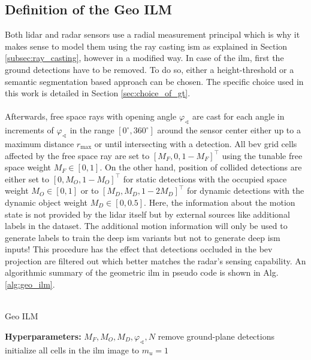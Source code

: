 \subsection{Definition of the Geo ILM}
\label{subsec:method_geo_ilm}
Both lidar and radar sensors use a radial measurement principal which is why it makes sense to model them using the ray casting \gls{ism} as explained in Section \ref{subsec:ray_casting}, however in a modified way. In case of the \gls{ilm}, first the ground detections have to be removed. To do so, either a height-threshold or a semantic segmentation based approach can be chosen. The specific choice used in this work is detailed in Section \ref{sec:choice_of_gt}.
\\\\
Afterwards, free space rays with opening angle $\varphi_\sphericalangle$ are cast for each angle in increments of $\varphi_\sphericalangle$ in the range $[0^\circ, 360^\circ]$ around the sensor center either up to a maximum distance $r_\text{max}$ or until intersecting with a detection. All \gls{bev} grid cells affected by the free space ray are set to $[M_F,0,1-M_F]^\top$ using the tunable free space weight $M_F \in [0,1]$. On the other hand, position of collided detections are either set to $[0,M_O,1-M_O]^\top$ for static detections with the occupied space weight $M_O \in [0,1]$ or to $[M_D, M_D, 1-2M_D]^\top$ for dynamic detections with the dynamic object weight $M_D \in [0,0.5]$. Here, the information about the motion state is not provided by the lidar itself but by external sources like additional labels in the dataset. The additional motion information will only be used to generate labels to train the deep \gls{ism} variants but not to generate deep \gls{ism} inputs! This procedure has the effect that detections occluded in the \gls{bev} projection are filtered out which better matches the radar's sensing capability. An algorithmic summary of the geometric \gls{ilm} in pseudo code is shown in Alg. \ref{alg:geo_ilm}.
\\\\
\begin{algorithm}[H]
	\caption{\label{alg:geo_ilm}Geo ILM}
	\textbf{Hyperparameters:} $M_F, M_O, M_D, \varphi_\sphericalangle, N$\;
	remove ground-plane detections\;
	initialize all cells in the \gls{ilm} image to $m_u=1$\;
\end{algorithm}

